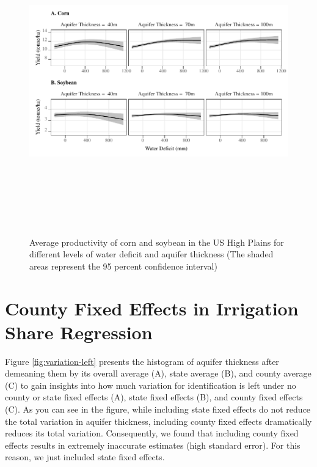 \documentclass[
]{article}
\begin{document}
\begin{figure}[H]

{\centering \includegraphics[width=6.5in,height=500px,]{Figures/g_avg_yield} 

}

\caption{Average productivity of corn and soybean in the US High Plains for different levels of water deficit and aquifer thickness (The shaded areas represent the 95 percent confidence interval)}\label{fig:avg-yield-ind}
\end{figure}

\clearpage

\hypertarget{county-fe}{%
\section{County Fixed Effects in Irrigation Share Regression}\label{county-fe}}

\setcounter{figure}{0}
\renewcommand{\thefigure}{B.\arabic{figure}}

Figure \ref{fig:variation-left} presents the histogram of aquifer thickness after demeaning them by its overall average (A), state average (B), and county average (C) to gain insights into how much variation for identification is left under no county or state fixed effects (A), state fixed effects (B), and county fixed effects (C). As you can see in the figure, while including state fixed effects do not reduce the total variation in aquifer thickness, including county fixed effects dramatically reduces its total variation. Consequently, we found that including county fixed effects results in extremely inaccurate estimates (high standard error). For this reason, we just included state fixed effects.
\end{document}

